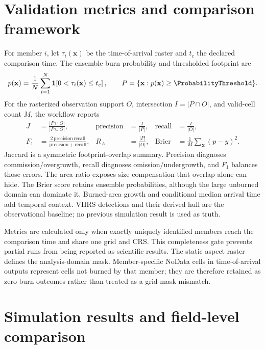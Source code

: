 \section{Validation metrics and comparison framework}

For member $i$, let $\tau_i(\mathbf{x})$ be the time-of-arrival raster and $t_c$
the declared comparison time.  The ensemble burn probability and thresholded
footprint are
\begin{equation}
 p(\mathbf{x})=\frac{1}{N}\sum_{i=1}^{N}
 \mathbf{1}\!\left[0<\tau_i(\mathbf{x})\le t_c\right],\qquad
 P=\{\mathbf{x}:p(\mathbf{x})\ge\ProbabilityThreshold\}.
\end{equation}
For the rasterized observation support $O$, intersection $I=|P\cap O|$, and
valid-cell count $M$, the workflow reports
\begin{align}
 J&=\frac{|P\cap O|}{|P\cup O|}, &
 \mathrm{precision}&=\frac{I}{|P|}, &
 \mathrm{recall}&=\frac{I}{|O|},\\
 F_1&=\frac{2\,\mathrm{precision}\,\mathrm{recall}}
 {\mathrm{precision}+\mathrm{recall}}, &
 R_A&=\frac{|P|}{|O|}, &
 \mathrm{Brier}&=\frac{1}{M}\sum_{\mathbf{x}}(p-y)^2.
\end{align}
Jaccard is a symmetric footprint-overlap summary.  Precision diagnoses
commission/overgrowth, recall diagnoses omission/undergrowth, and $F_1$ balances
those errors.  The area ratio exposes size compensation that overlap alone can
hide.  The Brier score retains ensemble probabilities, although the large
unburned domain can dominate it.  Burned-area growth and conditional median
arrival time add temporal context.  VIIRS detections and their derived hull are
the observational baseline; no previous simulation result is used as truth.

Metrics are calculated only when exactly \EnsembleSize{} uniquely identified
members reach the comparison time and share one grid and CRS.  This completeness
gate prevents partial runs from being reported as scientific results.
The static aspect raster defines the analysis-domain mask.  Member-specific
NoData cells in time-of-arrival outputs represent cells not burned by that
member; they are therefore retained as zero burn outcomes rather than treated
as a grid-mask mismatch.

\section{Simulation results and field-level comparison}

